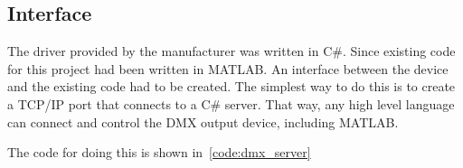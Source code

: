 \subsection{Interface}
The driver provided by the manufacturer was written in C\#.
Since existing code for this project had been written in MATLAB.
An interface between the device and the existing code had to be created.
The simplest way to do this is to create a TCP/IP port that connects to a C\# server.
That way, any high level language can connect and control the DMX output device, including MATLAB.

The code for doing this is shown in~\autoref{code:dmx_server}


